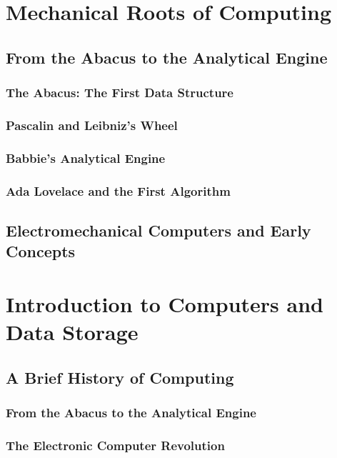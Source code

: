 \documentclass[12pt, oneside]{book}
\begin{document}
	\chapter{Mechanical Roots of Computing}
	\section{From the Abacus to the Analytical Engine}
	
	\subsection{The Abacus: The First Data Structure}
	
	\subsection{Pascalin and Leibniz's Wheel}
	
	\subsection{Babbie's Analytical Engine}
	
	\subsection{Ada Lovelace and the First Algorithm}
	
	\section{Electromechanical Computers and Early Concepts}
	
	\chapter{Introduction to Computers and Data Storage}
	\section{A Brief History of Computing}
	
	\subsection{From the Abacus to the Analytical Engine}
	
	\subsection{The Electronic Computer Revolution}
	
\end{document}
